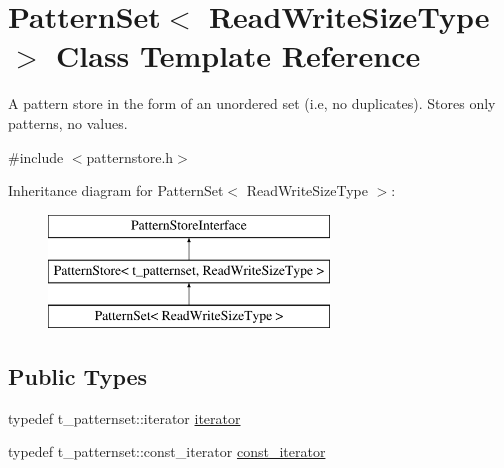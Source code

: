 \hypertarget{classPatternSet}{}\section{Pattern\+Set$<$ Read\+Write\+Size\+Type $>$ Class Template Reference}
\label{classPatternSet}


A pattern store in the form of an unordered set (i.\+e, no duplicates). Stores only patterns, no values.  




{\ttfamily \#include $<$patternstore.\+h$>$}

Inheritance diagram for Pattern\+Set$<$ Read\+Write\+Size\+Type $>$\+:\begin{figure}[H]
\begin{center}
\leavevmode
\includegraphics[height=3.000000cm]{classPatternSet}
\end{center}
\end{figure}
\subsection*{Public Types}
\begin{DoxyCompactItemize}
\item 
typedef t\+\_\+patternset\+::iterator \hyperlink{classPatternSet_a18b78ea966c57db2373741291ba610f3}{iterator}
\item 
typedef t\+\_\+patternset\+::const\+\_\+iterator \hyperlink{classPatternSet_a5d419991ea0abb0fbc4a2282574b1b8c}{const\+\_\+iterator}
\end{DoxyCompactItemize}
